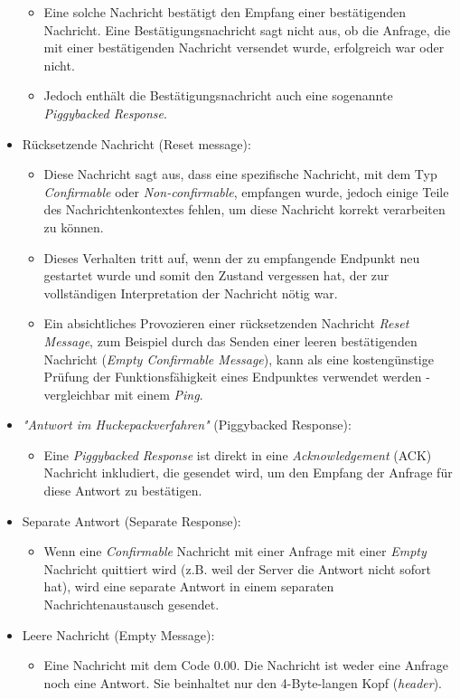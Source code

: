 \begin{itemize}
          \begin{itemize}
              \item Eine solche Nachricht bestätigt den Empfang einer bestätigenden Nachricht. Eine Bestätigungsnachricht sagt nicht aus, ob die Anfrage, die mit einer bestätigenden Nachricht versendet wurde, erfolgreich war oder nicht.
              \item Jedoch enthält die Bestätigungsnachricht auch eine sogenannte \textit{Piggybacked Response}.
          \end{itemize}
    \item Rücksetzende Nachricht (Reset message):
          \begin{itemize}
              \item Diese Nachricht sagt aus, dass eine spezifische Nachricht, mit dem Typ \textit{Confirmable} oder \textit{Non-confirmable}, empfangen wurde, jedoch einige Teile des Nachrichtenkontextes fehlen, um diese Nachricht korrekt verarbeiten zu können.
              \item Dieses Verhalten tritt auf, wenn der zu empfangende Endpunkt neu gestartet wurde und somit den Zustand vergessen hat, der zur vollständigen Interpretation der Nachricht nötig war.
              \item Ein absichtliches Provozieren einer rücksetzenden Nachricht \textit{Reset Message}, zum Beispiel durch das Senden einer leeren bestätigenden Nachricht (\textit{Empty Confirmable Message}), kann als eine kostengünstige Prüfung der Funktionsfähigkeit eines Endpunktes verwendet werden - vergleichbar mit einem \textit{Ping}.
          \end{itemize}
    \item \textit{"Antwort im Huckepackverfahren"} (Piggybacked Response):
          \begin{itemize}
              \item Eine \textit{Piggybacked Response} ist direkt in eine \textit{Acknowledgement} (ACK) Nachricht inkludiert, die gesendet wird, um den Empfang der Anfrage für diese Antwort zu bestätigen.
          \end{itemize}
    \item Separate Antwort (Separate Response):
          \begin{itemize}
              \item Wenn eine \textit{Confirmable} Nachricht mit einer Anfrage mit einer \textit{Empty} Nachricht quittiert wird (z.B. weil der Server die Antwort nicht sofort hat), wird eine separate Antwort in einem separaten Nachrichtenaustausch gesendet.
          \end{itemize}
    \item Leere Nachricht (Empty Message):
          \begin{itemize}
              \item Eine Nachricht mit dem Code 0.00. Die Nachricht ist weder eine Anfrage noch eine Antwort. Sie beinhaltet nur den 4-Byte-langen Kopf (\textit{header}).
          \end{itemize}
\end{itemize}

